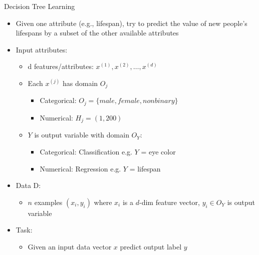 \begin{frame}[allowframebreaks]{Decision Tree Learning}
    \begin{itemize}
        \item Given one attribute (e.g., lifespan), try to predict the value of new people’s lifespans by a subset of the other available attributes

        \item Input attributes:
        \begin{itemize}
            \item d features/attributes: $x^{(1)}, x^{(2)}, \ldots, x^{(d)}$
            \item Each $x^{(j)}$ has domain $O_j$
            \begin{itemize}
                \item Categorical: $O_j = \{male, female, nonbinary\}$
                \item Numerical: $H_j = (1, 200)$
            \end{itemize}
            \item $Y$ is output variable with domain $O_Y$:
            \begin{itemize}
                \item Categorical: Classification e.g. $Y$ = eye color
                \item Numerical: Regression e.g. $Y$ = lifespan
            \end{itemize}
        \end{itemize}

        \framebreak

        \item Data D:
        \begin{itemize}
            \item $n$ examples $(x_i, y_i)$ where $x_i$ is a $d$-dim feature vector, $y_i \in O_Y$ is output variable
        \end{itemize}

        \item Task:
        \begin{itemize}
            \item Given an input data vector $x$ predict output label $y$
        \end{itemize}
    \end{itemize}
\end{frame}


